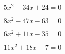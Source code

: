 \documentclass[a4paper]{article}
\begin{document}
\begin{equation}
	5x^2 -34x +24 = 0
\end{equation}

\begin{equation}
	8x^2 -47x -63 = 0
\end{equation}

\begin{equation}
	6x^2 +11x -35 = 0
\end{equation}

\begin{equation}
	11x^2 +18x -7 = 0
\end{equation}


%
\end{document}
